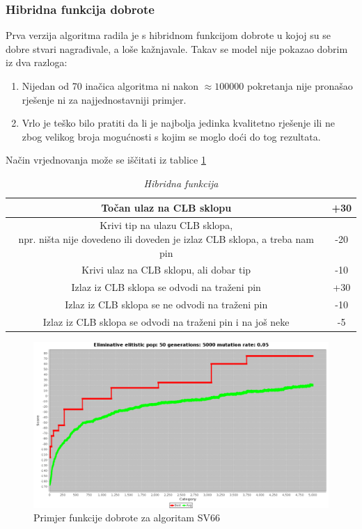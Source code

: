 \documentclass[times, utf8, zavrsni]{fer}
\begin{document}
\subsubsection{Hibridna funkcija dobrote}
 
Prva verzija algoritma radila je s hibridnom funkcijom dobrote u kojoj su se dobre stvari nagrađivale, a loše kažnjavale. Takav se model nije pokazao dobrim iz dva razloga:
\begin{enumerate}
	\item Nijedan od 70 inačica algoritma ni nakon $\approx100000$ pokretanja nije pronašao rješenje ni za najjednostavniji primjer.
	\item Vrlo je teško bilo pratiti da li je najbolja jedinka kvalitetno rješenje ili ne zbog velikog broja mogućnosti s kojim se moglo doći do tog rezultata. 
\end{enumerate}

Način vrjednovanja može se iščitati iz tablice \ref{HibridnaFunkcija}


\begin{table}[htb]
	\caption{\emph{Hibridna funkcija}}
	\label{HibridnaFunkcija}
	\centering
	\begin{tabular}{|c | c|} \hline
		Točan ulaz na CLB sklopu & +30 \\ \hline
		\makecell{Krivi tip na ulazu CLB sklopa, \\ npr. ništa nije dovedeno ili doveden je izlaz CLB sklopa, a treba nam pin} & -20 \\ \hline
		Krivi ulaz na CLB sklopu, ali dobar tip& -10 \\ \hline
		Izlaz iz CLB sklopa se odvodi na traženi pin & +30 \\ \hline
		Izlaz iz CLB sklopa se ne odvodi na traženi pin & -10 \\ \hline 
		Izlaz iz CLB sklopa se odvodi na traženi pin i na još neke & -5
	\end{tabular}
\end{table}

\begin{figure}[H]
	\centering
	\includegraphics[width=18cm]{slike/SV66Hibrid.png}
	\caption{Primjer funkcije dobrote za algoritam SV66}
	\label{fig:sv66-alg-hibrid}
\end{figure} 
\end{document}

